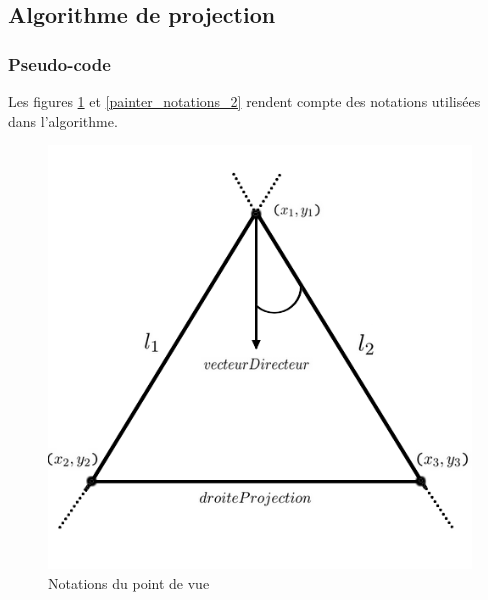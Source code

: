 \documentclass[11pt,a4paper]{article}
\theoremstyle{definition}
\theoremstyle{remark}
\begin{document}
\subsection{Algorithme de projection}

\subsubsection{Pseudo-code}

Les figures \ref{painter_notations} et \ref{painter_notations_2} rendent compte des notations utilisées dans l'algorithme.
\\
\begin{figure}[!htbp]
  \centering
  \begin{minipage}[b]{0.4\textwidth}
    \includegraphics[width=\textwidth]{painter_notations.png}
    \caption{Notations du point de vue}
		\label{painter_notations}
  \end{minipage}
  \hfill
  \begin{minipage}[b]{0.4\textwidth}

\end{minipage}
\end{figure}
\end{document}
